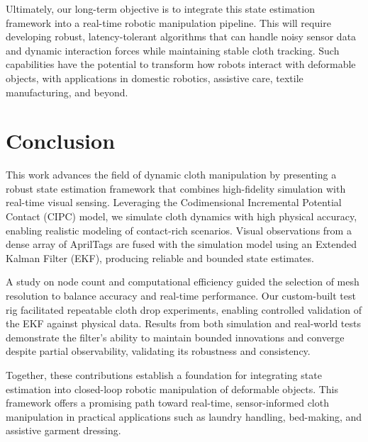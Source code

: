Ultimately, our long-term objective is to integrate this state estimation framework into a real-time robotic manipulation pipeline. This will require developing robust, latency-tolerant algorithms that can handle noisy sensor data and dynamic interaction forces while maintaining stable cloth tracking. Such capabilities have the potential to transform how robots interact with deformable objects, with applications in domestic robotics, assistive care, textile manufacturing, and beyond.

\section{Conclusion}

This work advances the field of dynamic cloth manipulation by presenting a robust state estimation framework that combines high-fidelity simulation with real-time visual sensing. Leveraging the Codimensional Incremental Potential Contact (CIPC) model, we simulate cloth dynamics with high physical accuracy, enabling realistic modeling of contact-rich scenarios. Visual observations from a dense array of AprilTags are fused with the simulation model using an Extended Kalman Filter (EKF), producing reliable and bounded state estimates.

A study on node count and computational efficiency guided the selection of mesh resolution to balance accuracy and real-time performance. Our custom-built test rig facilitated repeatable cloth drop experiments, enabling controlled validation of the EKF against physical data. Results from both simulation and real-world tests demonstrate the filter’s ability to maintain bounded innovations and converge despite partial observability, validating its robustness and consistency.

Together, these contributions establish a foundation for integrating state estimation into closed-loop robotic manipulation of deformable objects. This framework offers a promising path toward real-time, sensor-informed cloth manipulation in practical applications such as laundry handling, bed-making, and assistive garment dressing.






